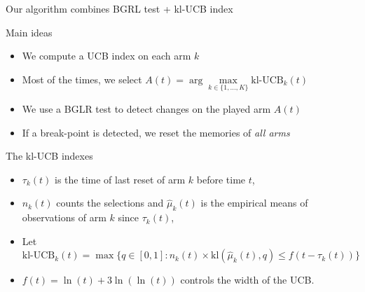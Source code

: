 \documentclass[11pt,english,ignorenonframetext,]{beamer}
\begin{document}
\begin{frame}{Our algorithm combines BGRL test + kl-UCB index}

  \begin{block}{Main ideas}
    \begin{itemize}
      \item We compute a UCB index on each arm $k$
      \item Most of the times, we select
      $A(t) = \arg\max\limits_{k\in \{1,\dots,K\}} \mbox{kl-UCB}_k(t)$
      \item We use a BGLR test \alert{to detect changes on the played arm $A(t)$}
      \item If a break-point is detected, \alert{we reset the memories of \emph{all arms}}
    \end{itemize}
  \end{block}

  \pause

  \begin{exampleblock}{The kl-UCB indexes}
    \begin{itemize}
      \item $\tau_k(t)$ is the time of last reset of arm $k$ before time $t$,
      \item $n_k(t)$ counts the selections and $\widehat{\mu}_k(t)$ is the empirical means of observations of arm $k$ since $\tau_k(t)$,
      \item Let {\small $\mbox{kl-UCB}_k(t) = \max \bigl\{ q\in[0,1] : n_k(t) \times \mathrm{kl}\left(\widehat{\mu}_k(t),q\right) \leq f(t - \tau_k(t)) \bigr\}$ }
      \item $f(t) = \ln(t) + 3 \ln(\ln(t))$ controls the width of the UCB.
    \end{itemize}
  \end{exampleblock}

\end{frame}
\end{document}

